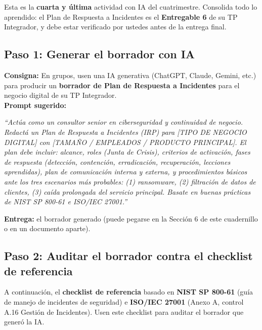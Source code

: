 \documentclass[12pt,a4paper]{article}
\begin{document}
\begin{cajaIA}
Esta es la \textbf{cuarta y \'ultima} actividad con IA del cuatrimestre. Consolida todo lo aprendido: el Plan de Respuesta a Incidentes es el \textbf{Entregable 6} de su TP Integrador, y debe estar verificado por ustedes antes de la entrega final.
\end{cajaIA}

\vspace{8pt}

\subsection{Paso 1: Generar el borrador con IA}

\begin{cajaIA}
\textbf{Consigna:} En grupos, usen una IA generativa (ChatGPT, Claude, Gemini, etc.) para producir un \textbf{borrador de Plan de Respuesta a Incidentes} para el negocio digital de su TP Integrador.\\[4pt]
\textbf{Prompt sugerido:}
\begin{tcolorbox}[colback=white, colframe=violetaIA!50, arc=2mm]
\small\textit{``Act\'ua como un consultor senior en ciberseguridad y continuidad de negocio. Redact\'a un Plan de Respuesta a Incidentes (IRP) para [TIPO DE NEGOCIO DIGITAL] con [TAMA\~NO / EMPLEADOS / PRODUCTO PRINCIPAL]. El plan debe incluir: alcance, roles (Junta de Crisis), criterios de activaci\'on, fases de respuesta (detecci\'on, contenci\'on, erradicaci\'on, recuperaci\'on, lecciones aprendidas), plan de comunicaci\'on interna y externa, y procedimientos b\'asicos ante los tres escenarios m\'as probables: (1) ransomware, (2) filtraci\'on de datos de clientes, (3) ca\'ida prolongada del servicio principal. Basate en buenas pr\'acticas de NIST SP 800-61 e ISO/IEC 27001.''}
\end{tcolorbox}
\textbf{Entrega:} el borrador generado (puede pegarse en la Secci\'on 6 de este cuadernillo o en un documento aparte).
\end{cajaIA}

\newpage
\subsection{Paso 2: Auditar el borrador contra el checklist de referencia}

\begin{cajaChecklist}
A continuaci\'on, el \textbf{checklist de referencia} basado en \textbf{NIST SP 800-61} (gu\'ia de manejo de incidentes de seguridad) e \textbf{ISO/IEC 27001} (Anexo A, control A.16 Gesti\'on de Incidentes). Usen este checklist para auditar el borrador que gener\'o la IA.
\end{cajaChecklist}
\end{document}
